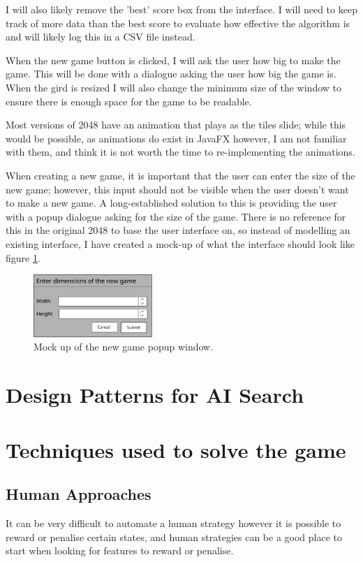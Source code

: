 \documentclass{article}
\begin{document}
I will also likely remove the 'best' score box from the interface. I will need to keep track of more data than the best score to evaluate how effective the algorithm is and will likely log this in a CSV file instead.

When the new game button is clicked, I will ask the user how big to make the game. This will be done with a dialogue asking the user how big the game is. When the gird is resized I will also change the minimum size of the window to ensure there is enough space for the game to be readable.

Most versions of 2048 have an animation that plays as the tiles slide; while this would be possible, as animations do exist in JavaFX \cite{javadocfx} however, I am not familiar with them, and think it is not worth the time to re-implementing the animations.

When creating a new game, it is important that the user can enter the size of the new game; however, this input should not be visible when the user doesn't want to make a new game. A long-established solution to this is providing the user with a popup dialogue asking for the size of the game. There is no reference for this in the original 2048 to base the user interface on, so instead of modelling an existing interface, I have created a mock-up of what the interface should look like figure \ref{fig:popup}.

\begin{figure}
    \centering
    \includegraphics[width=0.4\textwidth]{newGamePopup.png}
    \caption{Mock up of the new game popup window.}
    \label{fig:popup}
\end{figure}
\section{Design Patterns for AI Search}
\label{sec:dp}

\section{Techniques used to solve the game}
\label{sec:techniques}

\subsection{Human Approaches}
\label{subsec:human_techniques}
It can be very difficult to automate a human strategy however it is possible to reward or penalise certain states, and human strategies can be a good place to start when looking for features to reward or penalise.
\end{document}
